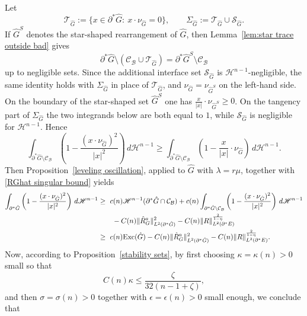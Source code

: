 \documentclass[reqno,11pt]{amsart}
\def\ez{\epsilon}
\def\sz{\sigma}
\newcommand{\HH}{\mathscr H}
\numberwithin{equation}{section}
\theoremstyle{remark}
\begin{document}
Let
\[
\mathcal T_{\hat G}:=\{x\in\partial^*\hat G:\ x\cdot\nu_{\hat G}=0\},
\qquad
\Sigma_{\hat G}:=\mathcal T_{\hat G}\cup\mathcal S_{\hat G}.
\]
If $\hat G^S$ denotes the star-shaped rearrangement of $\hat G$, then Lemma~\ref{lem:star trace outside bad} gives
\[
\partial^* \hat G \setminus(\mathcal C_{\mathcal B}\cup\mathcal T_{\hat G})
=\partial^* \hat G^S \setminus\mathcal C_{\mathcal B}
\]
up to negligible sets. Since the additional interface set
$\mathcal S_{\hat G}$ is $\HH^{n-1}$-negligible, the same identity holds with
$\Sigma_{\hat G}$ in place of $\mathcal T_{\hat G}$, and
$\nu_{\hat G}=\nu_{\hat G^S}$ on the left-hand
side. On the
boundary of the star-shaped set $\hat G^S$ one has
$\frac{x}{|x|}\cdot \nu_{\hat G^S}\ge 0$. On the tangency part of
$\Sigma_{\hat G}$ the two integrands below are both equal to $1$, while
$\mathcal S_{\hat G}$ is negligible for $\HH^{n-1}$. Hence
\begin{equation*}
\int_{\partial^* \hat G \setminus \mathcal C_{\mathcal B}}   \left(1-\frac{(x\cdot \nu_{\hat G})^2}{|x|^2}\right) \, d\mathscr H^{n-1}\ge \int_{\partial^* \hat G \setminus \mathcal C_{\mathcal B}}   \left(1-\frac{x}{|x|}\cdot \nu_{\hat G}\right) \, d\mathscr H^{n-1}.
\end{equation*}
Then Proposition~\ref{leveling oscillation}, applied to $\hat G$ with
$\lambda=r\mu$, together with  \eqref{RGhat singular bound} yields
\begin{equation}\label{to excess}
    \begin{split}
\int_{\partial^* {\hat G}} \left(1-\frac{(x\cdot \nu_{\hat G})^2}{|x|^2}\right) \, d\mathscr H^{n-1}
&\ge \ c(n)\mathscr H^{n-1}(\partial^* \hat G\cap \mathcal C_{\mathcal B})+ c(n)\int_{\partial^* \hat G \setminus \mathcal C_{\mathcal B}}   \left(1-\frac{(x\cdot \nu_{\hat G})^2}{|x|^2}\right) \, d\mathscr H^{n-1}\\
&\quad \quad - C(n) \|\hat R^a_G\|_{L^2(\partial^*\hat G)}^{2}-C(n)\| R\|_{L^2(\partial^*E)}^{\frac{2}{1-\eta}}\\
&\ge  \  c(n) {\rm Exc}(\hat G)- C(n) \|\hat R^a_G\|_{L^2(\partial^*\hat G)}^{2}-C(n)\|R\|_{L^2(\partial^*E)}^{\frac{2}{1-\eta}}. 
\end{split}
\end{equation}
Now, according to Proposition~\ref{stability sets},  by first choosing $\kappa=\kappa(n)>0$ small so that
$$C(n)\kappa\le \frac \zeta {32(n-1+\zeta)},$$ and then  $\sz=\sz(n)>0$ together with $\ez=\ez(n)>0$ small enough, we conclude  that
\end{document}
